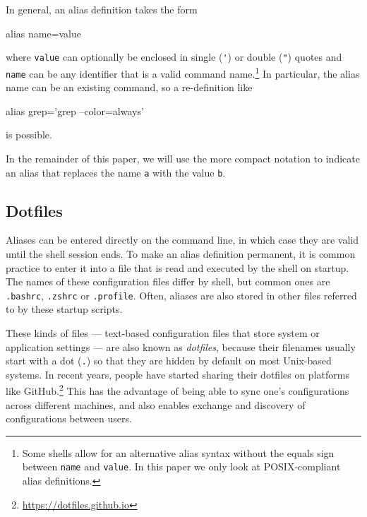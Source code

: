 

In general, an alias definition takes the form
\begin{CVerbatim}
alias name=value
\end{CVerbatim}
where \verb|value| can optionally be enclosed in single (\verb|'|) or double (\verb|"|) quotes and \verb|name| can be any identifier that is a valid command name.\footnote{Some shells allow for an alternative alias syntax without the equals sign between \texttt{name} and \texttt{value}. In this paper we only look at POSIX-compliant alias definitions.}
In particular, the alias name can be an existing command, so a re-definition like
\begin{CVerbatim}
alias grep='grep --color=always'
\end{CVerbatim}
is possible.

In the remainder of this paper, we will use the more compact notation  to indicate an alias that replaces the name \texttt{a} with the value \texttt{b}.

\subsection{Dotfiles}

Aliases can be entered directly on the command line, in which case they are valid until the shell session ends.
To make an alias definition permanent, it is common practice to enter it into a file that is read and executed by the shell on startup.
The names of these configuration files differ by shell, but common ones are \verb|.bashrc|, \verb|.zshrc| or \verb|.profile|.
Often, aliases are also stored in other files referred to by these startup scripts.

These kinds of files --- text-based configuration files that store system or application settings --- are also known as \emph{dotfiles}, because their filenames usually start with a dot (\verb|.|) so that they are hidden by default on most Unix-based systems.
In recent years, people have started sharing their dotfiles on platforms like GitHub.\footnote{\url{https://dotfiles.github.io}}
This has the advantage of being able to sync one's configurations across different machines, and also enables exchange and discovery of configurations between users.
